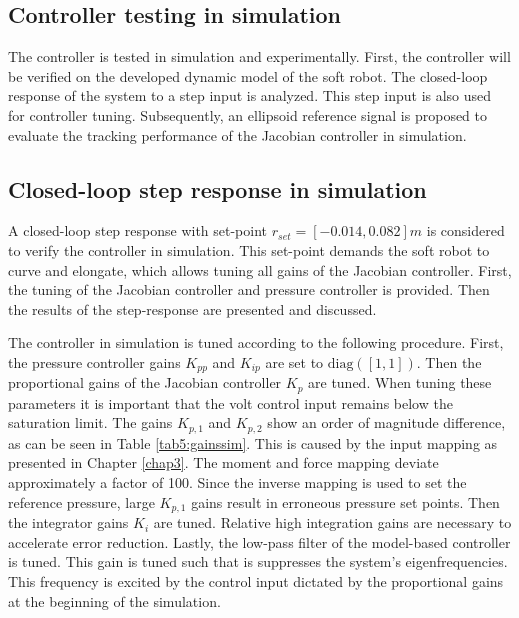 \subsection{Controller testing in simulation}

The controller is tested in simulation and experimentally. First, the controller will be verified on the developed dynamic model of the soft robot. The closed-loop response of the system to a step input is analyzed. This step input is also used for controller tuning. Subsequently, an ellipsoid reference signal is proposed to evaluate the tracking performance of the Jacobian controller in simulation. 


\subsection*{Closed-loop step response in simulation}

A closed-loop step response with set-point $r_{set} = [-0.014,0.082]m$ is considered to verify the controller in simulation. This set-point demands the soft robot to curve and elongate, which allows tuning all gains of the Jacobian controller. First, the tuning of the Jacobian controller and pressure controller is provided. Then the results of the step-response are presented and discussed. 

The controller in simulation is tuned according to the following procedure. First, the pressure controller gains $K_{pp}$ and $K_{ip}$ are set to $\text{diag}([1,1])$. Then the proportional gains of the Jacobian controller $K_p$ are tuned. When tuning these parameters it is important that the volt control input remains below the saturation limit. The gains $K_{p,1}$ and $K_{p,2}$ show an order of magnitude difference, as can be seen in Table \ref{tab5:gainssim}. This is caused by the input mapping as presented in Chapter \ref{chap3}. The moment and force mapping deviate approximately a factor of 100. Since the inverse mapping is used to set the reference pressure, large $K_{p,1}$ gains result in erroneous pressure set points. Then the integrator gains $K_i$ are tuned. Relative high integration gains are necessary to accelerate error reduction. Lastly, the low-pass filter of the model-based controller is tuned. This gain is tuned such that is suppresses the system's eigenfrequencies. This frequency is excited by the control input dictated by the proportional gains at the beginning of the simulation. 



